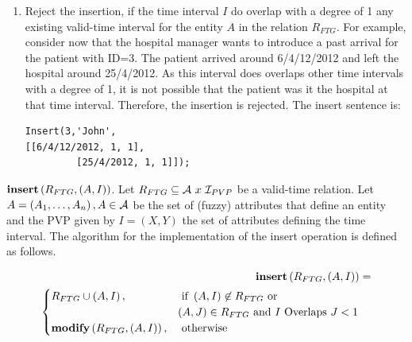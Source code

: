 \begin{enumerate}
\begin{enumerate}
	\item Reject the insertion, if the time interval $I$ do overlap with a degree of 1 any existing valid-time interval for the entity $A$ in the relation $R_{FTG}$. For example, consider now that the hospital manager wants to introduce a past arrival for the patient with ID=3. The patient arrived around 6/4/12/2012 and left the hospital around 25/4/2012. As this interval does overlaps other time intervals with a degree of 1, it is not possible that the patient was it the hospital at that time interval. Therefore, the insertion is rejected. The insert sentence is:

	      \begin{verbatim}
Insert(3,'John',
[[6/4/12/2012, 1, 1],
         [25/4/2012, 1, 1]]);
	    \end{verbatim}
	\end{enumerate}

\end{enumerate}

\begin{definition}
 \emph{$\mbox{\textbf{insert}} \left(R_{FTG} ,\left(A, I \right) \right)$}.
Let $R_{FTG} \subseteq \mathcal{A} \  x\  \mathcal{I}_{PVP}$ be a  valid-time relation. Let  $A=\left(A_1, \ldots, A_n \right), A \in \mathcal{A}$ be the set of (fuzzy) attributes that define an entity and the PVP given by $I = \left(X, Y\right)$ the set of attributes defining the time interval. The algorithm for the implementation of the insert operation is defined as follows.
\end{definition}




\begin{align}
\label{eq:insert-fuzzy-temporal}
\mbox{\textbf{insert}} \left(R_{FTG} ,\left(A, I \right) \right) &=\\
\begin{cases}
\nonumber
R_{FTG} \cup \left(A, I \right), & \mbox{ if }  \left(A, I \right) \not \in R_{FTG} \mbox{ or }\\
&  \left(A, J \right) \in R_{FTG} \mbox{ and } I \text{ Overlaps } J < 1\\
\mbox{\textbf{modify}} \left(R_{FTG}, \left(A, I \right)\right), & \mbox{ otherwise }  
\end{cases} 	
\end{align}
